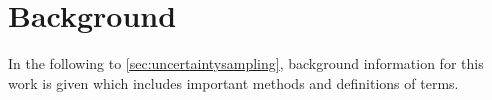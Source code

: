 \chapter{Background}
\label{ch:background}
%
In the following  to \ref{sec:uncertaintysampling}, background information for this work is given which includes important methods and definitions of terms.
%

%

%

%

%

%
